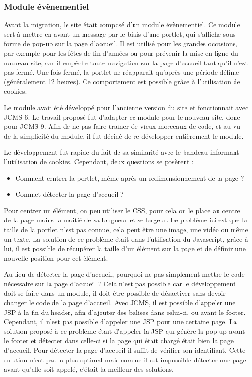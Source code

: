 \documentclass[12pt,a4paper]{article}
\begin{document}
\subsubsection{Module évènementiel}
Avant la migration, le site était composé d'un module évènementiel. Ce module sert à mettre en avant un message par le biais d'une portlet, qui s'affiche sous forme de pop-up sur la page d'accueil. Il est utilisé pour les grandes occasions, par exemple pour les fêtes de fin d'années ou pour prévenir la mise en ligne du nouveau site, car il empêche toute navigation sur la page d'accueil tant qu'il n'est pas fermé. Une fois fermé, la portlet ne réapparait qu'après une période définie (généralement 12 heures). Ce comportement est possible grâce à l'utilisation de cookies.\par 
Le module avait été développé pour l'ancienne version du site et fonctionnait avec JCMS 6. Le travail proposé fut d'adapter ce module pour le nouveau site, donc pour JCMS 9. Afin de ne pas faire trainer de vieux morceaux de code, et au vu de la simplicité du module, il fut décidé de re-développer entièrement le module.\par 
Le développement fut rapide du fait de sa similarité avec le bandeau informant l'utilisation de cookies. Cependant, deux questions se posèrent : 
\begin{itemize}
\item Comment centrer la portlet, même après un redimensionnement de la page ?
\item Commet détecter la page d'accueil ?
\end{itemize}\par
Pour centrer un élément, on peu utiliser le CSS, pour cela on le place au centre de la page moins la moitié de sa longueur et se largeur. Le problème ici est que la taille de la portlet n'est pas connue, cela peut être une image, une vidéo ou même un texte. La solution de ce problème était dans l'utilisation du Javascript, grâce à lui, il est possible de récupérer la taille d'un élément sur la page et de définir une nouvelle position pour cet élément.\par 
Au lieu de détecter la page d'accueil, pourquoi ne pas simplement mettre le code nécessaire sur la page d'accueil ? Cela n'est pas possible car le développement doit se faire dans un module, il doit être possible de désactiver sans devoir changer le code de la page d'accueil. Avec JCMS, il est possible d'appeler une JSP à la fin du header, afin d'ajouter des balises dans celui-ci, ou avant le footer. Cependant, il n'est pas possible d'appeler une JSP pour une certaine page. La solution proposé à ce problème était d'appeler la JSP qui génère la pop-up avant le footer et détecter dans celle-ci si la page qui était chargé était bien la page d'accueil. Pour détecter la page d'accueil il suffit de vérifier son identifiant. Cette solution n'est pas la plus optimal mais comme il est impossible détecter une page avant qu'elle soit appelé, c'était la meilleur des solutions.\par 
\end{document}
